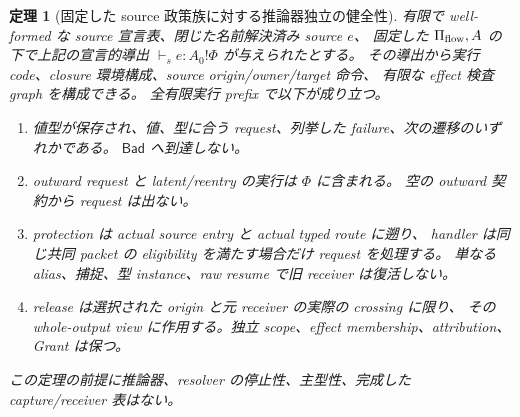 \documentclass[11pt,a4paper]{article}
\newtheorem{theorem}[definition]{定理}
\newcommand{\Bad}{\mathsf{Bad}}
\begin{document}
\begin{theorem}[固定した source 政策族に対する推論器独立の健全性]
\label{thm:source-safety-family}
有限で well-formed な source 宣言表、閉じた名前解決済み source \(e\)、
固定した \(\Pi_{\rm flow},A\) の下で上記の宣言的導出
\(\vdash_s e:A_0!\Phi\) が与えられたとする。
その導出から実行 code、closure 環境構成、source origin/owner/target 命令、
有限な effect 検査 graph を構成できる。
全有限実行 prefix で以下が成り立つ。
\begin{enumerate}
\item 値型が保存され、値、型に合う request、列挙した failure、次の遷移のいずれかである。
\(\Bad\) へ到達しない。
\item outward request と latent/reentry の実行は \(\Phi\) に含まれる。
空の outward 契約から request は出ない。
\item protection は actual source entry と actual typed route に遡り、
handler は同じ共同 packet の eligibility を満たす場合だけ request を処理する。
単なる alias、捕捉、型 instance、raw resume で旧 receiver は復活しない。
\item release は選択された origin と元 receiver の実際の crossing に限り、
その whole-output view に作用する。独立 scope、effect membership、attribution、Grant は保つ。
\end{enumerate}
この定理の前提に推論器、resolver の停止性、主型性、完成した capture/receiver 表はない。
\end{theorem}
\end{document}
